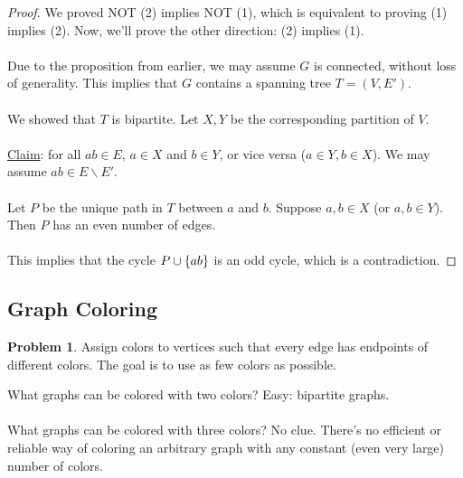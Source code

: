 \documentclass[]{article}
\theoremstyle{definition}
\newtheorem{problem}{Problem}[section]
\DeclarePairedDelimiter{\set}{\lbrace}{\rbrace}
\begin{document}
			\begin{proof}
				We proved NOT (2) implies NOT (1), which is equivalent to proving (1) implies (2). Now, we'll prove the other direction: (2) implies (1).
				\\ \\
				Due to the proposition from earlier, we may assume $G$ is connected, without loss of generality. This implies that $G$ contains a spanning tree $T = (V, E')$.
				\\ \\
				We showed that $T$ is bipartite. Let $X, Y$ be the corresponding partition of $V$.
				\\ \\
				\underline{Claim}: for all $ab \in E$, $a \in X$ and $b \in Y$, or vice versa ($a \in Y, b \in X$). We may assume $ab \in E \backslash E'$.
				\\ \\
				Let $P$ be the unique path in $T$ between $a$ and $b$. Suppose $a, b \in X$ (or $a, b \in Y$). Then $P$ has an even number of edges.
				\\ \\
				This implies that the cycle $P \cup \set{ab}$ is an odd cycle, which is a contradiction.
			\end{proof}
			
		\subsection{Graph Coloring}
			\begin{problem}
				Assign colors to vertices such that every edge has endpoints of different colors. The goal is to use as few colors as possible.
			\end{problem}

			What graphs can be colored with two colors? Easy: bipartite graphs.
			\\ \\
			What graphs can be colored with three colors? No clue. There's no efficient or reliable way of coloring an arbitrary graph with any constant (even very large) number of colors.
\end{document}
